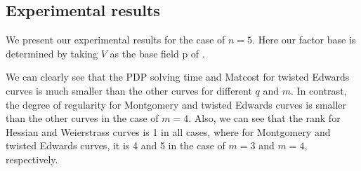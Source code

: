 \subsection{Experimental results}
%
\label{sec:experiment-result}

We present our experimental results for the case of $n=5$.
%
Here our factor base is determined by taking $V$ as the base field \F
p of .
%


We can clearly see that the PDP solving time and Matcost for twisted
Edwards curves is much smaller than the other curves for different $q$
and $m$.
%
In contrast, the degree of regularity for Montgomery and twisted
Edwards curves is smaller than the other curves in the case of $m=4$.
%
Also, we can see that the rank for Hessian and Weierstrass curves is 1
in all cases, where for Montgomery and twisted Edwards curves, it is 4
and 5 in the case of $m=3$ and $m=4$, respectively.
%







